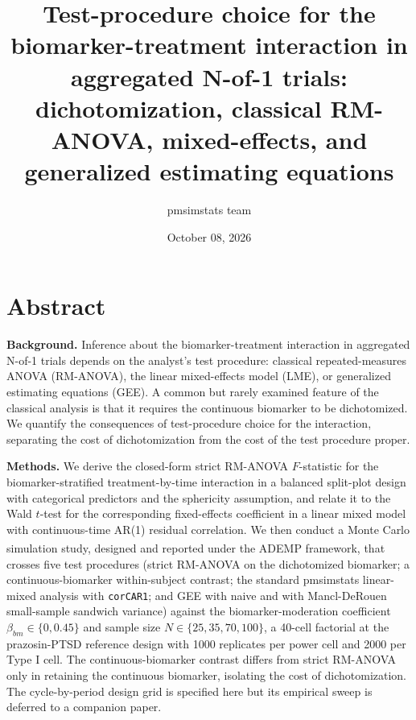 \documentclass[
  11pt,
]{article}
\title{Test-procedure choice for the biomarker-treatment interaction in aggregated N-of-1 trials: dichotomization, classical RM-ANOVA, mixed-effects, and generalized estimating equations}
\author{pmsimstats team}
\date{October 08, 2026}
\begin{document}
\maketitle

{
\setcounter{tocdepth}{2}
\tableofcontents
}
\section{Abstract}\label{abstract}

\textbf{Background.} Inference about the biomarker-treatment
interaction in aggregated N-of-1 trials depends on the analyst's
test procedure: classical repeated-measures ANOVA (RM-ANOVA),
the linear mixed-effects model (LME), or generalized estimating
equations (GEE). A common but rarely examined feature of the
classical analysis is that it requires the continuous biomarker
to be dichotomized. We quantify the consequences of test-procedure
choice for the interaction, separating the cost of dichotomization
from the cost of the test procedure proper.

\textbf{Methods.} We derive the closed-form strict RM-ANOVA
\(F\)-statistic for the biomarker-stratified treatment-by-time
interaction in a balanced split-plot design with categorical
predictors and the sphericity assumption, and relate it to the
Wald \(t\)-test for the corresponding fixed-effects coefficient in
a linear mixed model with continuous-time AR(1) residual
correlation. We then conduct a Monte Carlo simulation study,
designed and reported under the\textsuperscript{} ADEMP framework,
that crosses five test procedures (strict RM-ANOVA on the
dichotomized biomarker; a continuous-biomarker within-subject
contrast; the standard pmsimstats linear-mixed analysis with
\texttt{corCAR1}; and GEE with naive and with Mancl-DeRouen small-sample
sandwich variance) against the biomarker-moderation coefficient
\(\beta_{bm} \in \{0, 0.45\}\) and sample size \(N \in \{25, 35, 70,
100\}\), a 40-cell factorial at the prazosin-PTSD reference design
with 1000 replicates per power cell and 2000 per Type I cell.
The continuous-biomarker contrast differs from strict RM-ANOVA
only in retaining the continuous biomarker, isolating the cost
of dichotomization. The cycle-by-period design grid is specified
here but its empirical sweep is deferred to a companion paper.
\end{document}
